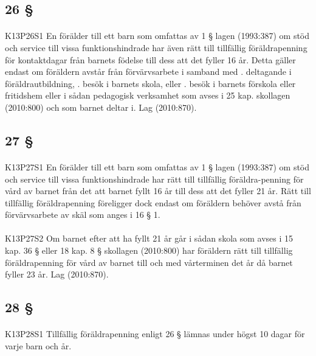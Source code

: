 \documentclass[a4paper,notitlepage,openany,10pt]{book}
\begin{document}
\subsection*{26 §}
\paragraph*{}
{\tiny K13P26S1}
En förälder till ett barn som omfattas av 1 § lagen (1993:387) om stöd och service till vissa funktionshindrade har även rätt till tillfällig föräldrapenning för kontaktdagar från barnets födelse till dess att det fyller 16 år. Detta gäller endast om föräldern avstår från förvärvsarbete i samband med
. deltagande i föräldrautbildning,
. besök i barnets skola, eller
. besök i barnets förskola eller fritidshem eller i sådan pedagogisk verksamhet som avses i 25 kap. skollagen (2010:800) och som barnet deltar i.
Lag (2010:870).
\subsection*{27 §}
\paragraph*{}
{\tiny K13P27S1}
En förälder till ett barn som omfattas av 1 § lagen (1993:387) om stöd och service till vissa funktionshindrade har rätt till tillfällig föräldra-penning för vård av barnet från det att barnet fyllt 16 år till dess att det fyller 21 år. Rätt till tillfällig föräldrapenning föreligger dock endast om föräldern behöver avstå från förvärvsarbete av skäl som anges i 16 § 1.
\paragraph*{}
{\tiny K13P27S2}
Om barnet efter att ha fyllt 21 år går i sådan skola som avses i 15 kap. 36 § eller 18 kap. 8 § skollagen (2010:800) har föräldern rätt till tillfällig föräldrapenning för vård av barnet till och med vårterminen det år då barnet fyller 23 år.
Lag (2010:870).
\subsection*{28 §}
\paragraph*{}
{\tiny K13P28S1}
Tillfällig föräldrapenning enligt 26 § lämnas under högst 10 dagar för varje barn och år.
\end{document}
